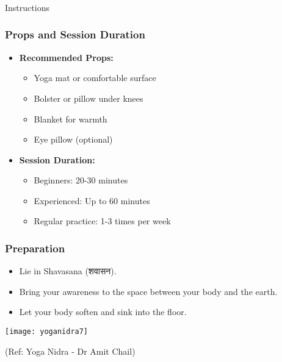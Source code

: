 \begin{frame}[fragile]\frametitle{}
\begin{center}
{\Large Instructions}
\end{center}
\end{frame}

\begin{frame}[fragile]\frametitle{Props and Session Duration}
    \begin{itemize}
        \item \textbf{Recommended Props:}
        \begin{itemize}
            \item Yoga mat or comfortable surface
            \item Bolster or pillow under knees
            \item Blanket for warmth
            \item Eye pillow (optional)
        \end{itemize}
        \item \textbf{Session Duration:}
        \begin{itemize}
            \item Beginners: 20-30 minutes
            \item Experienced: Up to 60 minutes
            \item Regular practice: 1-3 times per week
        \end{itemize}
    \end{itemize}
\end{frame}

\begin{frame}[fragile]\frametitle{Preparation}
    \begin{itemize}
        \item Lie in Shavasana (शवासन).
        \item Bring your awareness to the space between your body and the earth.
        \item Let your body soften and sink into the floor.    
	\end{itemize}
	
      \begin{center}
        \texttt{[image: yoganidra7]}

		{\tiny (Ref: Yoga Nidra - Dr Amit Chail)}		
        \end{center}	
\end{frame}

